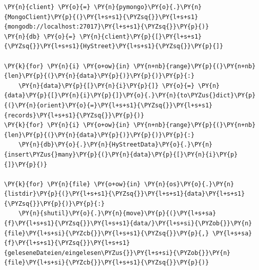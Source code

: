 \bigbreak
\begin{tcolorbox}[breakable, size=fbox, boxrule=1pt, pad at break*=1mm,colback=cellbackground, colframe=cellborder]
\begin{Verbatim}[commandchars=\\\{\}]
\PY{n}{client} \PY{o}{=} \PY{n}{pymongo}\PY{o}{.}\PY{n}{MongoClient}\PY{p}{(}\PY{l+s+s1}{\PYZsq{}}\PY{l+s+s1}{mongodb://localhost:27017}\PY{l+s+s1}{\PYZsq{}}\PY{p}{)}
\PY{n}{db} \PY{o}{=} \PY{n}{client}\PY{p}{[}\PY{l+s+s1}{\PYZsq{}}\PY{l+s+s1}{HyStreet}\PY{l+s+s1}{\PYZsq{}}\PY{p}{]}

\PY{k}{for} \PY{n}{i} \PY{o+ow}{in} \PY{n+nb}{range}\PY{p}{(}\PY{n+nb}{len}\PY{p}{(}\PY{n}{data}\PY{p}{)}\PY{p}{)}\PY{p}{:}
    \PY{n}{data}\PY{p}{[}\PY{n}{i}\PY{p}{]} \PY{o}{=} \PY{n}{data}\PY{p}{[}\PY{n}{i}\PY{p}{]}\PY{o}{.}\PY{n}{to\PYZus{}dict}\PY{p}{(}\PY{n}{orient}\PY{o}{=}\PY{l+s+s1}{\PYZsq{}}\PY{l+s+s1}{records}\PY{l+s+s1}{\PYZsq{}}\PY{p}{)}
\PY{k}{for} \PY{n}{i} \PY{o+ow}{in} \PY{n+nb}{range}\PY{p}{(}\PY{n+nb}{len}\PY{p}{(}\PY{n}{data}\PY{p}{)}\PY{p}{)}\PY{p}{:}
    \PY{n}{db}\PY{o}{.}\PY{n}{HyStreetData}\PY{o}{.}\PY{n}{insert\PYZus{}many}\PY{p}{(}\PY{n}{data}\PY{p}{[}\PY{n}{i}\PY{p}{]}\PY{p}{)}

\PY{k}{for} \PY{n}{file} \PY{o+ow}{in} \PY{n}{os}\PY{o}{.}\PY{n}{listdir}\PY{p}{(}\PY{l+s+s1}{\PYZsq{}}\PY{l+s+s1}{data}\PY{l+s+s1}{\PYZsq{}}\PY{p}{)}\PY{p}{:}
    \PY{n}{shutil}\PY{o}{.}\PY{n}{move}\PY{p}{(}\PY{l+s+sa}{f}\PY{l+s+s1}{\PYZsq{}}\PY{l+s+s1}{data/}\PY{l+s+si}{\PYZob{}}\PY{n}{file}\PY{l+s+si}{\PYZcb{}}\PY{l+s+s1}{\PYZsq{}}\PY{p}{,} \PY{l+s+sa}{f}\PY{l+s+s1}{\PYZsq{}}\PY{l+s+s1}{geleseneDateien/eingelesen\PYZus{}}\PY{l+s+si}{\PYZob{}}\PY{n}{file}\PY{l+s+si}{\PYZcb{}}\PY{l+s+s1}{\PYZsq{}}\PY{p}{)}
\end{Verbatim}
\end{tcolorbox}
\bigbreak